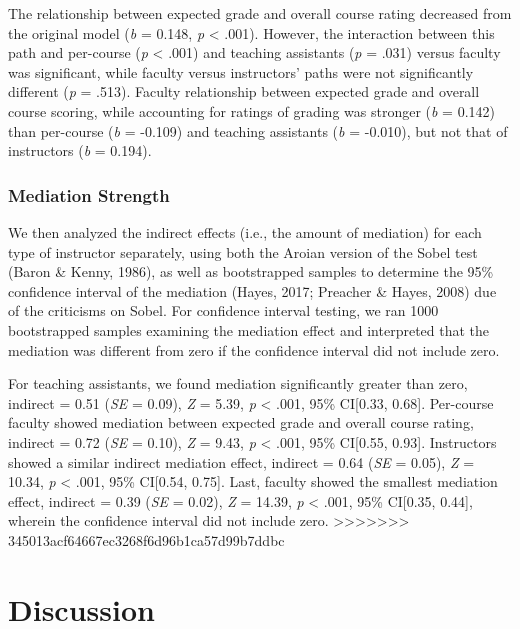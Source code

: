 \documentclass[man]{apa6}
\theoremstyle{definition}
\theoremstyle{definition}
\theoremstyle{definition}
\theoremstyle{remark}
\begin{document}
The relationship between expected grade and overall course rating decreased from the original model (\emph{b} = 0.148, \emph{p} \textless{} .001). However, the interaction between this path and per-course (\emph{p} \textless{} .001) and teaching assistants (\emph{p} = .031) versus faculty was significant, while faculty versus instructors' paths were not significantly different (\emph{p} = .513). Faculty relationship between expected grade and overall course scoring, while accounting for ratings of grading was stronger (\emph{b} = 0.142) than per-course (\emph{b} = -0.109) and teaching assistants (\emph{b} = -0.010), but not that of instructors (\emph{b} = 0.194).

\hypertarget{mediation-strength}{%
\subsubsection{Mediation Strength}\label{mediation-strength}}

We then analyzed the indirect effects (i.e., the amount of mediation) for each type of instructor separately, using both the Aroian version of the Sobel test (Baron \& Kenny, 1986), as well as bootstrapped samples to determine the 95\% confidence interval of the mediation (Hayes, 2017; Preacher \& Hayes, 2008) due of the criticisms on Sobel. For confidence interval testing, we ran 1000 bootstrapped samples examining the mediation effect and interpreted that the mediation was different from zero if the confidence interval did not include zero.

For teaching assistants, we found mediation significantly greater than zero, indirect = 0.51 (\emph{SE} = 0.09), \emph{Z} = 5.39, \emph{p} \textless{} .001, 95\% CI{[}0.33, 0.68{]}. Per-course faculty showed mediation between expected grade and overall course rating, indirect = 0.72 (\emph{SE} = 0.10), \emph{Z} = 9.43, \emph{p} \textless{} .001, 95\% CI{[}0.55, 0.93{]}. Instructors showed a similar indirect mediation effect, indirect = 0.64 (\emph{SE} = 0.05), \emph{Z} = 10.34, \emph{p} \textless{} .001, 95\% CI{[}0.54, 0.75{]}. Last, faculty showed the smallest mediation effect, indirect = 0.39 (\emph{SE} = 0.02), \emph{Z} = 14.39, \emph{p} \textless{} .001, 95\% CI{[}0.35, 0.44{]}, wherein the confidence interval did not include zero.
>>>>>>> 345013acf64667ec3268f6d96b1ca57d99b7ddbc

\section{Discussion}\label{discussion}
\end{document}
